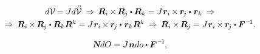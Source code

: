 \nopagebreak\vspace{-0.25em}\begin{equation*}\begin{array}{c}
d\mathcal{V} \hspace{-0.2ex} = J d\mathcircabove{\mathcal{V}} \:\Rightarrow\,
\bm{R}_i \hspace{-0.1ex} \times \hspace{-0.2ex} \bm{R}_{\hspace{-0.1ex}j} \dotp \bm{R}_k = J \hspace{.12ex} \bm{r}_i \hspace{-0.16ex} \times \hspace{-0.1ex} \bm{r}_{\hspace{-0.2ex}j} \dotp \hspace{.16ex} \bm{r}_k \:\Rightarrow \\[.32em]
%
\Rightarrow\: \bm{R}_i \hspace{-0.1ex} \times \hspace{-0.2ex} \bm{R}_{\hspace{-0.1ex}j} \dotp \bm{R}_k \bm{R}^k = J \hspace{.12ex} \bm{r}_i \hspace{-0.16ex} \times \hspace{-0.1ex} \bm{r}_{\hspace{-0.2ex}j} \dotp \hspace{.16ex} \bm{r}_k \bm{R}^k
\:\Rightarrow\,
\bm{R}_i \hspace{-0.1ex} \times \hspace{-0.2ex} \bm{R}_{\hspace{-0.1ex}j} = J \hspace{.12ex} \bm{r}_i \hspace{-0.16ex} \times \hspace{-0.1ex} \bm{r}_{\hspace{-0.2ex}j} \dotp \bm{F}^{\hspace{.1ex}\expminusone} \hspace{-0.1ex}.
\end{array}\end{equation*}



\vspace{-0.16em}\begin{equation}\label{areachange:nansonformula}
\mathboldN dO = J \hspace{.1ex} \bm{n} do \dotp \bm{F}^{\hspace{.1ex}\expminusone} \hspace{-0.1ex},
\end{equation}

